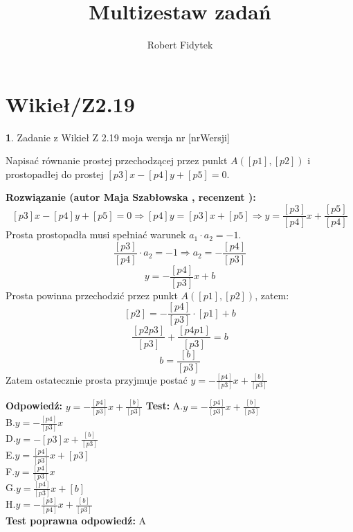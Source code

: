 \documentclass[12pt, a4paper]{article}
\title{Multizestaw zadań}
\author{Robert Fidytek}
\date{}
\theoremstyle{definition} %
\newtheorem{zad}{}
\newcommand{\kategoria}[1]{\section{#1}} %
\newcommand{\zadStart}[1]{\begin{zad}#1\newline} %
\newcommand{\zadStop}{\end{zad}}   %
\newcommand{\rozwStart}[2]{\noindent \textbf{Rozwiązanie (autor #1 , recenzent #2): }\newline} %
\newcommand{\rozwStop}{\newline}                                            %
\newcommand{\odpStart}{\noindent \textbf{Odpowiedź:}\newline}    %
\newcommand{\odpStop}{\newline}                                             %
\newcommand{\testStart}{\noindent \textbf{Test:}\newline} %
\newcommand{\testStop}{\newline} %
\newcommand{\kluczStart}{\noindent \textbf{Test poprawna odpowiedź:}\newline} %
\newcommand{\kluczStop}{\newline} %
\begin{document}
\maketitle


\kategoria{Wikieł/Z2.19}
\zadStart{Zadanie z Wikieł Z 2.19  moja wersja nr [nrWersji]}

Napisać równanie prostej przechodzącej przez punkt $A([p1],[p2])$ i prostopadłej do prostej $[p3]x-[p4]y+[p5]=0.$
\zadStop

\rozwStart{Maja Szabłowska}{}
$$[p3]x-[p4]y+[p5]=0 \Rightarrow [p4]y=[p3]x+[p5] \Rightarrow y=\frac{[p3]}{[p4]}x+\frac{[p5]}{[p4]}$$
Prosta prostopadła musi spełniać warunek $a_{1}\cdot a_{2}=-1.$
$$\frac{[p3]}{[p4]}\cdot a_{2}=-1 \Rightarrow a_{2}=-\frac{[p4]}{[p3]}$$
 $$y=-\frac{[p4]}{[p3]}x+b$$
 Prosta powinna przechodzić przez punkt $A([p1],[p2])$, zatem:
 $$[p2]=-\frac{[p4]}{[p3]}\cdot [p1] +b$$
 $$\frac{[p2p3]}{[p3]}+\frac{[p4p1]}{[p3]}=b$$
 $$b=\frac{[b]}{[p3]}$$
 Zatem ostatecznie prosta przyjmuje postać $y=-\frac{[p4]}{[p3]}x+\frac{[b]}{[p3]}$
\rozwStop


\odpStart
$y=-\frac{[p4]}{[p3]}x+\frac{[b]}{[p3]}$
\odpStop
\testStart
A.$y=-\frac{[p4]}{[p3]}x+\frac{[b]}{[p3]}$\\
B.$y=-\frac{[p4]}{[p3]}x$\\
D.$y=-[p3]x+\frac{[b]}{[p3]}$\\
E.$y=\frac{[p4]}{[p3]}x+[p3]$\\
F.$y=\frac{[p4]}{[p3]}x$\\
G.$y=\frac{[p4]}{[p3]}x+[b]$\\
H.$y=-\frac{[p3]}{[p4]}x+\frac{[b]}{[p3]}$\\
\testStop
\kluczStart
A
\kluczStop
\end{document}

